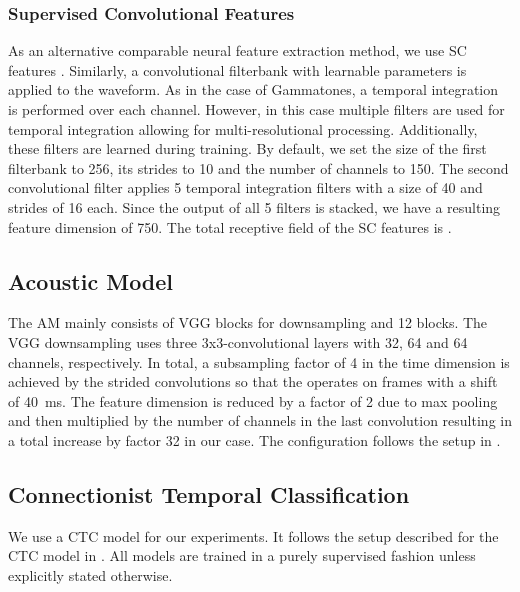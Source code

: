 \documentclass{INTERSPEECH2023}
\begin{document}
\subsubsection{Supervised Convolutional Features}
As an alternative comparable neural feature extraction method, we use \gls{SC} features \cite{tuske2018:waveform, vieting2021waveform}.
Similarly, a convolutional filterbank with learnable parameters is applied to the waveform.
As in the case of Gammatones, a temporal integration is performed over each channel.
However, in this case multiple filters are used for temporal integration allowing for multi-resolutional processing.
Additionally, these filters are learned during training.
By default, we set the size of the first filterbank to 256, its strides to 10 and the number of channels to 150.
The second convolutional filter applies 5 temporal integration filters with a size of 40 and strides of 16 each.
Since the output of all 5 filters is stacked, we have a resulting feature dimension of 750.
The total receptive field of the \gls{SC} features is .

\subsection{Acoustic Model}
The \gls{AM} mainly consists of \gls{VGG} \addref blocks for downsampling and 12 \conformer blocks.
The \gls{VGG} downsampling uses three 3x3-convolutional layers with 32, 64 and 64 channels, respectively.
In total, a subsampling factor of 4 in the time dimension is achieved by the strided convolutions so that the \conformer operates on frames with a shift of \SI{40}{\milli\second}.
The feature dimension is reduced by a factor of 2 due to max pooling and then multiplied by the number of channels in the last convolution resulting in a total increase by factor 32 in our case.
The configuration follows the setup in \cite{zeineldeen2022robustconformer} .

\subsection{Connectionist Temporal Classification}
We use a \gls{CTC} model for our experiments.
It follows the setup described for the \gls{CTC} model in \cite{zhou2022efficient}.
All models are trained in a purely supervised fashion unless explicitly stated otherwise.
\end{document}
